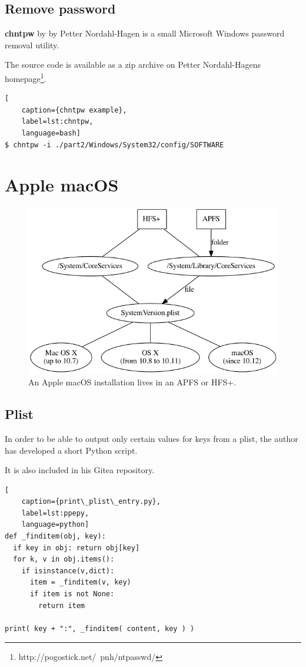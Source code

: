 \subsection{Remove password}

\textbf{chntpw} by by Petter Nordahl-Hagen is a small Microsoft Windows password removal utility.

The source code is available as a zip archive on Petter Nordahl-Hagens homepage\footnote{http://pogostick.net/~pnh/ntpasswd/}.

\begin{lstlisting}[
    caption={chntpw example},
    label=lst:chntpw,
    language=bash]
$ chntpw -i ./part2/Windows/System32/config/SOFTWARE
\end{lstlisting}

\section{ Apple macOS}

\begin{figure}[htbp]  %
  \centering
  \includegraphics[width=.5\textwidth]{figures/fs-to-macOS.png}
  \caption[APFS/HFS+ and Apple macOS]{An Apple macOS installation lives in an APFS or HFS+.}
  \label{fig:fs-mac}
\end{figure}

\subsection{Plist}

In order to be able to output only certain values for keys from a plist, the author has developed a short Python script.

It is also included in his Gitea repository.

\begin{lstlisting}[
    caption={print\_plist\_entry.py},
    label=lst:ppepy,
    language=python]
def _finditem(obj, key):
  if key in obj: return obj[key]
  for k, v in obj.items():
    if isinstance(v,dict):
      item = _finditem(v, key)
      if item is not None:
        return item

print( key + ":", _finditem( content, key ) )
\end{lstlisting}

